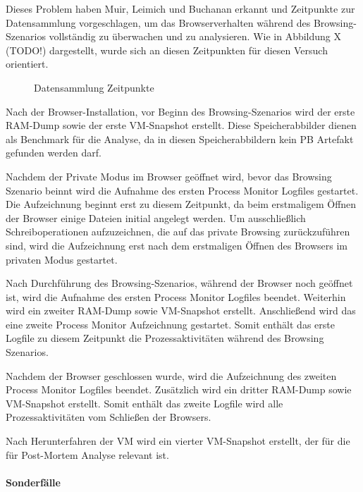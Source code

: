 Dieses Problem haben Muir, Leimich und Buchanan erkannt und Zeitpunkte zur Datensammlung vorgeschlagen, um das Browserverhalten während des Browsing-Szenarios vollständig zu überwachen und zu analysieren. Wie in Abbildung X (TODO!) dargestellt, wurde sich an diesen Zeitpunkten für diesen Versuch orientiert.
\begin{figure}[h!]
	\centering
	\small
	\centerline{\resizebox{\linewidth}{!}{}}
	\caption{Datensammlung Zeitpunkte}
	\label{fig:jes}
\end{figure}
Nach der Browser-Installation, vor Beginn des Browsing-Szenarios wird der erste RAM-Dump sowie der erste VM-Snapshot erstellt.
Diese Speicherabbilder dienen als Benchmark für die Analyse, da in diesen Speicherabbildern kein PB Artefakt gefunden werden darf.

Nachdem der Private Modus im Browser geöffnet wird, bevor das Browsing Szenario beinnt wird die Aufnahme des ersten Process Monitor Logfiles gestartet.
Die Aufzeichnung beginnt erst zu diesem Zeitpunkt, da beim erstmaligem Öffnen der Browser einige Dateien initial angelegt werden. Um ausschließlich Schreiboperationen aufzuzeichnen, die auf das private Browsing zurückzuführen sind, wird die Aufzeichnung erst nach dem erstmaligen Öffnen des Browsers im privaten Modus gestartet.

Nach Durchführung des Browsing-Szenarios, während der Browser noch geöffnet ist, wird die Aufnahme des ersten Process Monitor Logfiles beendet. Weiterhin wird ein zweiter RAM-Dump sowie VM-Snapshot erstellt. Anschließend wird das eine zweite Process Monitor Aufzeichnung gestartet. 
Somit enthält das erste Logfile zu diesem Zeitpunkt die Prozessaktivitäten während des Browsing Szenarios. 

Nachdem der Browser geschlossen wurde, wird die Aufzeichnung des zweiten Process Monitor Logfiles beendet. Zusätzlich wird ein dritter RAM-Dump sowie  VM-Snapshot erstellt. Somit enthält das zweite Logfile wird alle Prozessaktivitäten vom Schließen der Browsers.

Nach Herunterfahren der VM wird ein vierter VM-Snapshot erstellt, der für die für Post-Mortem Analyse relevant ist.

\paragraph*{Sonderfälle}

